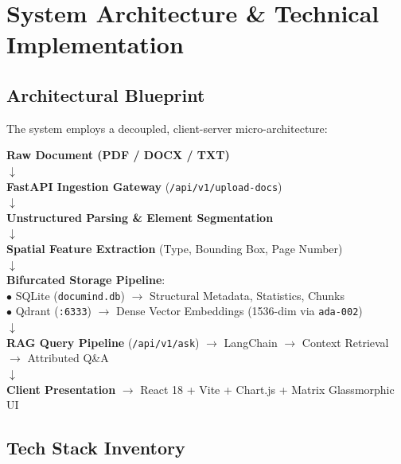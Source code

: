 \documentclass[11pt,a4paper]{article}
\begin{document}
\section{System Architecture \& Technical Implementation}

\subsection{Architectural Blueprint}
The system employs a decoupled, client-server micro-architecture:

\begin{tcolorbox}[colback=codebg,colframe=primaryblue,title=\textbf{System Architectural Flow}]
\centering
\textbf{Raw Document (PDF / DOCX / TXT)} \\
$\downarrow$ \\
\textbf{FastAPI Ingestion Gateway} (\texttt{/api/v1/upload-docs}) \\
$\downarrow$ \\
\textbf{Unstructured Parsing \& Element Segmentation} \\
$\downarrow$ \\
\textbf{Spatial Feature Extraction} (Type, Bounding Box, Page Number) \\
$\downarrow$ \\
\textbf{Bifurcated Storage Pipeline}: \\
$\bullet$ SQLite (\texttt{documind.db}) $\rightarrow$ Structural Metadata, Statistics, Chunks \\
$\bullet$ Qdrant (\texttt{:6333}) $\rightarrow$ Dense Vector Embeddings (1536-dim via \texttt{ada-002}) \\
$\downarrow$ \\
\textbf{RAG Query Pipeline} (\texttt{/api/v1/ask}) $\rightarrow$ LangChain $\rightarrow$ Context Retrieval $\rightarrow$ Attributed Q\&A \\
$\downarrow$ \\
\textbf{Client Presentation} $\rightarrow$ React 18 + Vite + Chart.js + Matrix Glassmorphic UI
\end{tcolorbox}

\subsection{Tech Stack Inventory}
\end{document}
